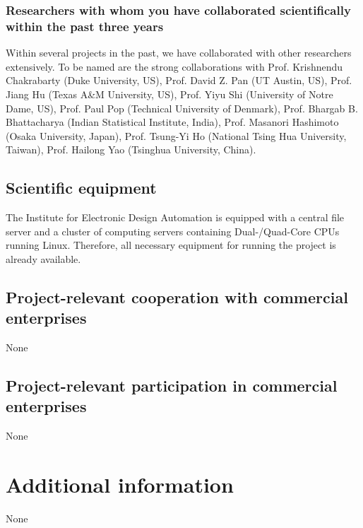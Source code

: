 \subsubsection{Researchers with whom you have collaborated scientifically
within the past three years}
Within several projects in the past,
we have collaborated with
other researchers extensively.
To be named are the strong collaborations with 
Prof. Krishnendu Chakrabarty (Duke University, US),
Prof. David Z. Pan (UT Austin, US), 
Prof. Jiang Hu (Texas A\&M University, US),
Prof. Yiyu Shi (University of Notre Dame, US),
Prof. Paul Pop (Technical University of Denmark),
Prof. Bhargab B. Bhattacharya (Indian Statistical Institute, India),
Prof. Masanori Hashimoto (Osaka University, Japan),
Prof. Tsung-Yi Ho (National Tsing Hua University, Taiwan), 
Prof. Hailong Yao (Tsinghua University, China).



\subsection{Scientific equipment}
The Institute for Electronic Design Automation is equipped with a central file
server and a cluster of computing servers containing 
Dual-/Quad-Core CPUs running Linux. Therefore,
all necessary equipment for running the project is already available.

\subsection{Project-relevant cooperation with commercial enterprises}

None

\subsection{Project-relevant participation in commercial enterprises}

None

\vskip 2pt
\section{Additional information}
None




